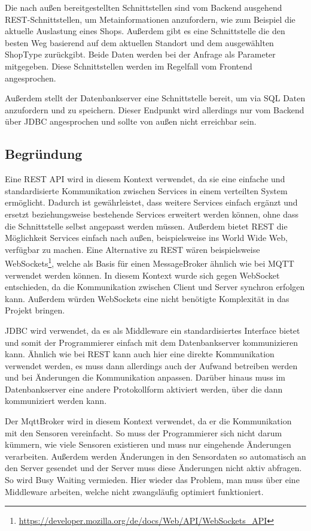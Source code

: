 \documentclass[runningheads]{llncs}
\begin{document}
Die nach außen bereitgestellten Schnittstellen sind vom Backend ausgehend REST-Schnittstellen, um Metainformationen anzufordern, wie zum Beispiel die aktuelle Auslastung eines Shops.
Außerdem gibt es eine Schnittstelle die den besten Weg basierend auf dem aktuellen Standort und dem ausgewählten ShopType zurückgibt.
Beide Daten werden bei der Anfrage als Parameter mitgegeben.
Diese Schnittstellen werden im Regelfall vom Frontend angesprochen.

Außerdem stellt der Datenbankserver eine Schnittstelle bereit, um via SQL Daten anzufordern und zu speichern.
Dieser Endpunkt wird allerdings nur vom Backend über JDBC angesprochen und sollte von außen nicht erreichbar sein.

\subsection{Begründung}
Eine REST API wird in diesem Kontext verwendet, da sie eine einfache und standardisierte Kommunikation zwischen Services in einem verteilten System ermöglicht.
Dadurch ist gewährleistet, dass weitere Services einfach ergänzt und ersetzt beziehungsweise bestehende Services erweitert werden können, ohne dass die Schnittstelle selbst angepasst werden müssen.
Außerdem bietet REST die Möglichkeit Services einfach nach außen, beispielsweise ins World Wide Web, verfügbar zu machen.
Eine Alternative zu REST wären beispielsweise WebSockets\footnote{\url{https://developer.mozilla.org/de/docs/Web/API/WebSockets\_API}}, welche als Basis für einen MessageBroker ähnlich wie bei MQTT verwendet werden können.
In diesem Kontext wurde sich gegen WebSocket entschieden, da die Kommunikation zwischen Client und Server synchron erfolgen kann.
Außerdem würden WebSockets eine nicht benötigte Komplexität in das Projekt bringen.

JDBC wird verwendet, da es als Middleware ein standardisiertes Interface bietet und somit der Programmierer einfach mit dem Datenbankserver kommunizieren kann.
Ähnlich wie bei REST kann auch hier eine direkte Kommunikation verwendet werden, es muss dann allerdings auch der Aufwand betreiben werden und bei Änderungen die Kommunikation anpassen.
Darüber hinaus muss im Datenbankserver eine andere Protokollform aktiviert werden, über die dann kommuniziert werden kann.

Der MqttBroker wird in diesem Kontext verwendet, da er die Kommunikation mit den Sensoren vereinfacht.
So muss der Programmierer sich nicht darum kümmern, wie viele Sensoren existieren und muss nur eingehende Änderungen verarbeiten.
Außerdem werden Änderungen in den Sensordaten so automatisch an den Server gesendet und der Server muss diese Änderungen nicht aktiv abfragen.
So wird Busy Waiting vermieden.
Hier wieder das Problem, man muss über eine Middleware arbeiten, welche nicht zwangsläufig optimiert funktioniert.


\newpage


\end{document}
